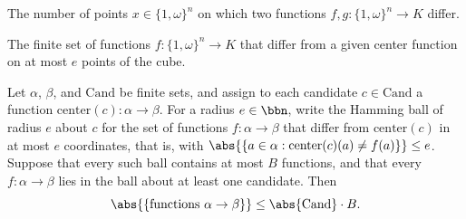 \begin{definition}
\label{RazborovSmolensky.rootCubeFunctionBadCount}
\leanok
{}
The number of points $x \in \{1,\omega\}^n$ on which two functions
$f, g : \{1,\omega\}^n \to K$ differ.
\end{definition}

\begin{definition}
\label{RazborovSmolensky.rootCubeBall}
\leanok
{}
The finite set of functions $f : \{1,\omega\}^n \to K$ that differ from a given center
function on at most $e$ points of the cube.
\end{definition}

\begin{theorem}
\label{RazborovSmolensky.finite_cover_by_hamming_balls_card_bound}
\leanok
{}
Let $\alpha$, $\beta$, and $\mathrm{Cand}$ be finite sets, and assign to each candidate
$c \in \mathrm{Cand}$ a function $\mathrm{center}(c) \colon \alpha \to \beta$. For a
radius $e \in \bbn$, write the Hamming ball of radius $e$ about $c$ for the set of
functions $f \colon \alpha \to \beta$ that differ from $\mathrm{center}(c)$ in at most
$e$ coordinates, that is, with $\abs{\{a \in \alpha : \mathrm{center}(c)(a) \neq f(a)\}}
\le e$. Suppose that every such ball contains at most $B$ functions, and that every $f
\colon \alpha \to \beta$ lies in the ball about at least one candidate. Then \[
\abs{\{\text{functions } \alpha \to \beta\}} \le \abs{\mathrm{Cand}} \cdot B. \]
\end{theorem}

